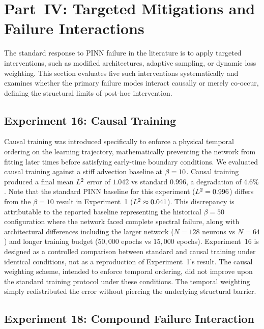 \section{Part~IV: Targeted Mitigations and Failure Interactions}\label{sec:part4}

The standard response to PINN failure in the literature is to apply targeted interventions, such as modified architectures, adaptive sampling, or dynamic loss weighting. This section evaluates five such interventions systematically and examines whether the primary failure modes interact causally or merely co-occur, defining the structural limits of post-hoc intervention.

\subsection{Experiment 16: Causal Training}\label{sec:exp16}

Causal training \cite{Wang2022causal} was introduced specifically to enforce a physical temporal ordering on the learning trajectory, mathematically preventing the network from fitting later times before satisfying early-time boundary conditions. We evaluated causal training against a stiff advection baseline at $\beta=10$. Causal training produced a final mean $L^2$ error of $1.042$ vs standard $0.996$, a degradation of $4.6\%$. Note that the standard PINN baseline for this experiment ($L^2 = 0.996$) differs from the $\beta=10$ result in Experiment~1 ($L^2 \approx 0.041$). This discrepancy is attributable to the reported baseline representing the historical $\beta=50$ configuration where the network faced complete spectral failure, along with architectural differences including the larger network ($N=128$ neurons vs $N=64$) and longer training budget ($50,000$ epochs vs $15,000$ epochs). Experiment~16 is designed as a controlled comparison between standard and causal training under identical conditions, not as a reproduction of Experiment~1's result. The causal weighting scheme, intended to enforce temporal ordering, did not improve upon the standard training protocol under these conditions. The temporal weighting simply redistributed the error without piercing the underlying structural barrier.

\subsection{Experiment 18: Compound Failure Interaction}\label{sec:exp18}

